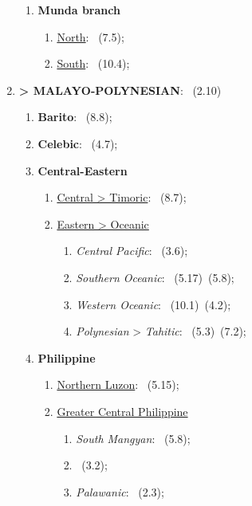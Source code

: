 \begin{enumerate}
\begin{enumerate}
        \item \textbf{Munda branch}
        \begin{enumerate}
            \item \uline{North}: \langnameMundari\ (7.5);
            \item \uline{South}: \langnameKharia\ (10.4);
        \end{enumerate}
    \end{enumerate}
    \item \MakeUppercase{\textbf{\langfamily{\famAustronesian} > MALAYO-POLYNESIAN}}: \langnameJavanese\ (2.10)
    \begin{enumerate}
        \item \textbf{Barito}: \langnameMalagasy\ (8.8);
        \item \textbf{Celebic}: \langnameTolaki\ (4.7);
        \item \textbf{Central-Eastern}
        \begin{enumerate}
            \item \uline{Central > Timoric}: \langnameTetum\ (8.7);
            \item \uline{Eastern > Oceanic}
            \begin{enumerate}
                \item \textit{Central Pacific}: \langnameFijian\ (3.6);
                \item \textit{Southern Oceanic}: \langnameIaai\ (5.17)\EnumComma\langnameTanna\ (5.8);
                \item \textit{Western Oceanic}: \langnameManam\ (10.1)\EnumComma\langnameRoro\ (4.2);
                \item \textit{Polynesian} > \textit{Tahitic}: \langnameMaori\ (5.3)\EnumComma\langnameTahitian\ (7.2);
            \end{enumerate}
        \end{enumerate}
        \item \textbf{Philippine}
        \begin{enumerate}
            \item \uline{Northern Luzon}: \langnameIlocano\ (5.15);
            \item \uline {Greater Central Philippine}
            \begin{enumerate}
                \item \textit{South Mangyan}: \langnameHanunoo\ (5.8);
                \item \langnameManobo\ (3.2);
                \item \textit{Palawanic}: \langnameTagbanwa\ (2.3);

\end{enumerate}
\end{enumerate}
\end{enumerate}
\end{enumerate}
